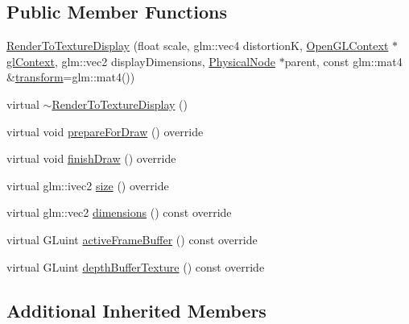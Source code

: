 \subsection*{Public Member Functions}
\begin{DoxyCompactItemize}
\item 
\hyperlink{classmotorcar_1_1RenderToTextureDisplay_a9c79fc8d2429e8b15c0353a5a9fce42f}{Render\-To\-Texture\-Display} (float scale, glm\-::vec4 distortion\-K, \hyperlink{classmotorcar_1_1OpenGLContext}{Open\-G\-L\-Context} $\ast$\hyperlink{classmotorcar_1_1Display_a884dd0b78dbecee82a33eb6d26a2a403}{gl\-Context}, glm\-::vec2 display\-Dimensions, \hyperlink{classmotorcar_1_1PhysicalNode}{Physical\-Node} $\ast$parent, const glm\-::mat4 \&\hyperlink{classmotorcar_1_1SceneGraphNode_ad96e79fdd739ac8223a3128003be391a}{transform}=glm\-::mat4())
\item 
virtual \hyperlink{classmotorcar_1_1RenderToTextureDisplay_a9cb7b619ef7450f8c208961d83671998}{$\sim$\-Render\-To\-Texture\-Display} ()
\item 
virtual void \hyperlink{classmotorcar_1_1RenderToTextureDisplay_abdf6861fe69ada64fafd0a7713391bed}{prepare\-For\-Draw} () override
\item 
virtual void \hyperlink{classmotorcar_1_1RenderToTextureDisplay_a5a312b98ac49013155797e814e6cf69e}{finish\-Draw} () override
\item 
virtual glm\-::ivec2 \hyperlink{classmotorcar_1_1RenderToTextureDisplay_a2e10611cf3fd629a4d962988642ad5b2}{size} () override
\item 
virtual glm\-::vec2 \hyperlink{classmotorcar_1_1RenderToTextureDisplay_a0ede4d9139786227f2c5d87bbbb9dcfa}{dimensions} () const override
\item 
virtual G\-Luint \hyperlink{classmotorcar_1_1RenderToTextureDisplay_a8c928fb82c28d4785c58a1bd321e0ca6}{active\-Frame\-Buffer} () const override
\item 
virtual G\-Luint \hyperlink{classmotorcar_1_1RenderToTextureDisplay_a4dca5858105e2ee493ef0c49e62c37d4}{depth\-Buffer\-Texture} () const override
\end{DoxyCompactItemize}
\subsection*{Additional Inherited Members}


